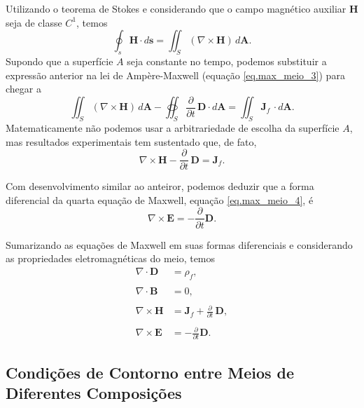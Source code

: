 Utilizando o teorema de Stokes e considerando que o campo  magn\'etico auxiliar $\mathbf{H}$ seja de classe $C^1$, temos
\begin{equation*}
\oint_s\mathbf{H}\cdot d\mathbf{s}=\iint_S(\nabla\times\mathbf{H})\,d\mathbf{A}.
\end{equation*}
Supondo que a superf\'icie $A$ seja constante no tempo, podemos substituir a express\~ao anterior na lei de Amp\`ere-Maxwell (equa\c{c}\~ao \ref{eq.max_meio_3}) para chegar a
\begin{equation*}
\iint_S(\nabla\times\mathbf{H})\,d\mathbf{A}-\oiint_S\frac{\partial}{\partial t}\,\mathbf{D}\cdot d\mathbf{A}=\iint_S\mathbf{J}_f\,\cdot d\mathbf{A}.
\end{equation*}
Matematicamente n\~ao podemos usar a arbitrariedade de escolha da superf\'icie $A$, mas resultados experimentais tem sustentado que, de fato,
\begin{equation*}
\nabla\times\mathbf{H}-\frac{\partial}{\partial t}\,\mathbf{D}=\mathbf{J}_f.
\end{equation*}

Com desenvolvimento similar ao anteiror, podemos deduzir que a forma diferencial da quarta equa\c{c}\~ao de Maxwell, equa\c{c}\~ao \ref{eq.max_meio_4}, \'e
\begin{equation*}
\nabla\times\mathbf{E}=-\frac{\partial}{\partial t}\mathbf{D}.
\end{equation*}

Sumarizando as equa\c{c}\~oes de Maxwell em suas formas diferenciais e considerando as propriedades eletromagn\'eticas do meio, temos
\begin{align}
\nabla\cdot\mathbf{D}&=\rho_f,\\\nonumber\\
\nabla\cdot\mathbf{B}&=0,\\\nonumber\\
\nabla\times\mathbf{H}&=\mathbf{J}_f+\frac{\partial}{\partial t}\,\mathbf{D},\\\nonumber\\
\nabla\times\mathbf{E}&=-\frac{\partial}{\partial t}\mathbf{D}.
\end{align} 

\subsection{Condi\c{c}\~oes de Contorno entre Meios de Diferentes Composi\c{c}\~oes}

